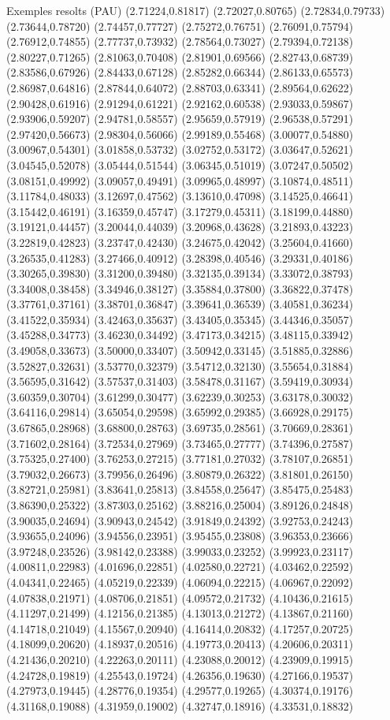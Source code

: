 \documentclass[11pt,a4paper]{article}
\begin{document}
\begin{fmex}{Exemples resolts (PAU)}
(2.71224,0.81817) (2.72027,0.80765) (2.72834,0.79733) (2.73644,0.78720) (2.74457,0.77727) (2.75272,0.76751) (2.76091,0.75794) (2.76912,0.74855) (2.77737,0.73932) (2.78564,0.73027) (2.79394,0.72138) (2.80227,0.71265) (2.81063,0.70408) (2.81901,0.69566) (2.82743,0.68739) (2.83586,0.67926) (2.84433,0.67128) (2.85282,0.66344) (2.86133,0.65573) (2.86987,0.64816) (2.87844,0.64072) (2.88703,0.63341) (2.89564,0.62622) (2.90428,0.61916) (2.91294,0.61221) (2.92162,0.60538) (2.93033,0.59867) (2.93906,0.59207) (2.94781,0.58557) (2.95659,0.57919) (2.96538,0.57291) (2.97420,0.56673) (2.98304,0.56066) (2.99189,0.55468) (3.00077,0.54880) (3.00967,0.54301) (3.01858,0.53732) (3.02752,0.53172) (3.03647,0.52621) (3.04545,0.52078) (3.05444,0.51544) (3.06345,0.51019) (3.07247,0.50502) (3.08151,0.49992) (3.09057,0.49491) (3.09965,0.48997) (3.10874,0.48511) (3.11784,0.48033) (3.12697,0.47562) (3.13610,0.47098) (3.14525,0.46641) (3.15442,0.46191) (3.16359,0.45747) (3.17279,0.45311) (3.18199,0.44880) (3.19121,0.44457) (3.20044,0.44039) (3.20968,0.43628) (3.21893,0.43223) (3.22819,0.42823) (3.23747,0.42430) (3.24675,0.42042) (3.25604,0.41660) (3.26535,0.41283) (3.27466,0.40912) (3.28398,0.40546) (3.29331,0.40186) (3.30265,0.39830) (3.31200,0.39480) (3.32135,0.39134) (3.33072,0.38793) (3.34008,0.38458) (3.34946,0.38127) (3.35884,0.37800) (3.36822,0.37478) (3.37761,0.37161) (3.38701,0.36847) (3.39641,0.36539) (3.40581,0.36234) (3.41522,0.35934) (3.42463,0.35637) (3.43405,0.35345) (3.44346,0.35057) (3.45288,0.34773) (3.46230,0.34492) (3.47173,0.34215) (3.48115,0.33942) (3.49058,0.33673) (3.50000,0.33407) (3.50942,0.33145) (3.51885,0.32886) (3.52827,0.32631) (3.53770,0.32379) (3.54712,0.32130) (3.55654,0.31884) (3.56595,0.31642) (3.57537,0.31403) (3.58478,0.31167) (3.59419,0.30934) (3.60359,0.30704) (3.61299,0.30477) (3.62239,0.30253) (3.63178,0.30032) (3.64116,0.29814) (3.65054,0.29598) (3.65992,0.29385) (3.66928,0.29175) (3.67865,0.28968) (3.68800,0.28763) (3.69735,0.28561) (3.70669,0.28361) (3.71602,0.28164) (3.72534,0.27969) (3.73465,0.27777) (3.74396,0.27587) (3.75325,0.27400) (3.76253,0.27215) (3.77181,0.27032) (3.78107,0.26851) (3.79032,0.26673) (3.79956,0.26496) (3.80879,0.26322) (3.81801,0.26150) (3.82721,0.25981) (3.83641,0.25813) (3.84558,0.25647) (3.85475,0.25483) (3.86390,0.25322) (3.87303,0.25162) (3.88216,0.25004) (3.89126,0.24848) (3.90035,0.24694) (3.90943,0.24542) (3.91849,0.24392) (3.92753,0.24243) (3.93655,0.24096) (3.94556,0.23951) (3.95455,0.23808) (3.96353,0.23666) (3.97248,0.23526) (3.98142,0.23388) (3.99033,0.23252) (3.99923,0.23117) (4.00811,0.22983) (4.01696,0.22851) (4.02580,0.22721) (4.03462,0.22592) (4.04341,0.22465) (4.05219,0.22339) (4.06094,0.22215) (4.06967,0.22092) (4.07838,0.21971) (4.08706,0.21851) (4.09572,0.21732) (4.10436,0.21615) (4.11297,0.21499) (4.12156,0.21385) (4.13013,0.21272) (4.13867,0.21160) (4.14718,0.21049) (4.15567,0.20940) (4.16414,0.20832) (4.17257,0.20725) (4.18099,0.20620) (4.18937,0.20516) (4.19773,0.20413) (4.20606,0.20311) (4.21436,0.20210) (4.22263,0.20111) (4.23088,0.20012) (4.23909,0.19915) (4.24728,0.19819) (4.25543,0.19724) (4.26356,0.19630) (4.27166,0.19537) (4.27973,0.19445) (4.28776,0.19354) (4.29577,0.19265) (4.30374,0.19176) (4.31168,0.19088) (4.31959,0.19002) (4.32747,0.18916) (4.33531,0.18832) 
\end{fmex}
\end{document}
